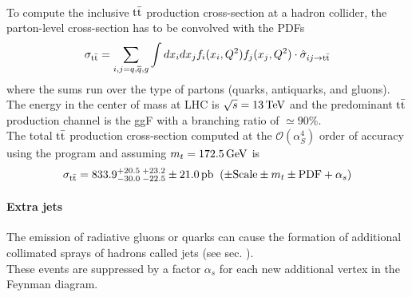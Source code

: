 \\
To compute the inclusive ${{\text{t}}{\bar{\text{t}}}}$ production cross-section at a hadron collider, the parton-level cross-section has to be convolved with the PDFs
\begin{equation}
    \sigma_{\mathrm{t\bar{t}}}=\sum_{i,j=q,\overline{{{q}}},g}\int d x_{i}d x_{j}f_{i}(x_{i},Q^{2})f_{j}(x_{j},Q^{2})\cdot\hat{\sigma}_{i j\rightarrow {\ensuremath{{\text{t}}{\bar{\text{t}}}}}}
\end{equation}
where the sums run over the type of partons (quarks, antiquarks, and gluons).
The energy in the center of mass at LHC is $\sqrt{s}=13 {\,\text{Te\hspace{-.08em}V}}$ and the predominant ${{\text{t}}{\bar{\text{t}}}}$ production channel is the ggF with a branching ratio of $\simeq 90\%$.\\
The total ${{\text{t}}{\bar{\text{t}}}}$ production cross-section computed at the $\mathcal{O} (\alpha_S^4)$ order of accuracy using the program \Toppp \cite{Czakon2014Top++:Colliders} and assuming $m_t=172.5{\,\text{Ge\hspace{-.08em}V}}$ is  \cite{TtbarNNLOTWiki}
\begin{equation}
    \sigma_{{\text{t}}{\bar{\text{t}}}} = 833.9^{+20.5}_{-30.0}\, ^{+23.2}_{-22.5}\pm 21.0\,  \text{pb}\; \; (\pm \text{Scale} \pm m_t \pm \text{PDF}+\alpha_s)
\end{equation}
\paragraph*{Extra jets}
The emission of radiative gluons or quarks can cause the formation of additional collimated sprays of hadrons called jets (see sec. \ADDREF).\\
These events are suppressed by a factor $\alpha_s$ for each new additional vertex in the Feynman diagram.

